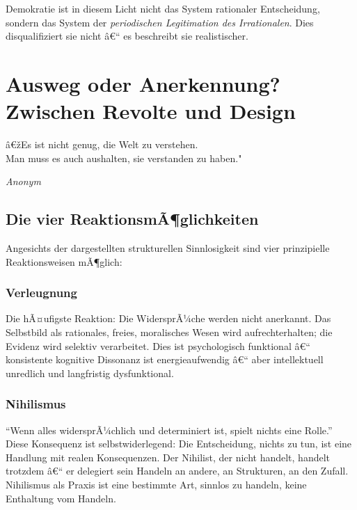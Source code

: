 ﻿\documentclass[12pt, a4paper]{article}
\begin{document}
Demokratie ist in diesem Licht nicht das System rationaler Entscheidung,
sondern das System der \emph{periodischen Legitimation des Irrationalen}.
Dies disqualifiziert sie nicht â€“ es beschreibt sie realistischer.

\section{Ausweg oder Anerkennung? Zwischen Revolte und Design}

\epigraph{â€žEs ist nicht genug, die Welt zu verstehen.\\
Man muss es auch aushalten, sie verstanden zu haben."}{\textit{Anonym}}

\subsection{Die vier ReaktionsmÃ¶glichkeiten}

Angesichts der dargestellten strukturellen Sinnlosigkeit sind vier prinzipielle
Reaktionsweisen mÃ¶glich:

\subsubsection{Verleugnung}

Die hÃ¤ufigste Reaktion: Die WidersprÃ¼che werden nicht anerkannt. Das
Selbstbild als rationales, freies, moralisches Wesen wird aufrechterhalten;
die Evidenz wird selektiv verarbeitet. Dies ist psychologisch funktional â€“
konsistente kognitive Dissonanz ist energieaufwendig â€“ aber intellektuell
unredlich und langfristig dysfunktional.

\subsubsection{Nihilismus}

\enquote{Wenn alles widersprÃ¼chlich und determiniert ist, spielt nichts eine
Rolle.} Diese Konsequenz ist selbstwiderlegend: Die Entscheidung, nichts zu
tun, ist eine Handlung mit realen Konsequenzen. Der Nihilist, der nicht handelt,
handelt trotzdem â€“ er delegiert sein Handeln an andere, an Strukturen, an den
Zufall. Nihilismus als Praxis ist eine bestimmte Art, sinnlos zu handeln,
keine Enthaltung vom Handeln.
\end{document}
